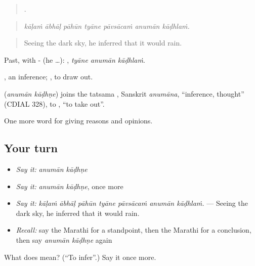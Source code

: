 \begin{quote}
      .
\end{quote}

\begin{quote}
\emph{kāḷaṁ ābhāḷ pāhūn tyāne pāvsācaṁ anumān kāḍhlaṁ.}
\end{quote}

\begin{quote}
Seeing the dark sky, he inferred that it would rain.
\end{quote}

Past, with - (he …):   , \emph{tyāne anumān kāḍhlaṁ}.

, an inference; , to draw out.

\begin{cousinweb}
\textbf{ } (\emph{anumān kāḍhṇe}) joins the tatsama , Sanskrit \emph{anumāna}, \textquotedblleft{}inference, thought\textquotedblright{} (CDIAL 328), to , \textquotedblleft{}to take out\textquotedblright{}.
\end{cousinweb}

\begin{grammarlens}[title={What you've built}]
One more word for giving reasons and opinions.
\end{grammarlens}

\subsection*{Your turn}
\begin{itemize}
\raggedright
  \item \emph{Say it:} \emph{anumān kāḍhṇe}
  \item \emph{Say it:} \emph{anumān kāḍhṇe}, once more
  \item \emph{Say it:} \emph{kāḷaṁ ābhāḷ pāhūn tyāne pāvsācaṁ anumān kāḍhlaṁ.} — Seeing the dark sky, he inferred that it would rain.
  \item \emph{Recall:} say the Marathi for a standpoint, then the Marathi for a conclusion, then say \emph{anumān kāḍhṇe} again
\end{itemize}

\begin{tcolorbox}[breakable,colback=teal!4,colframe=teal!35!black,title={Before you move on}]
What does   mean? (\textquotedblleft{}To infer\textquotedblright{}.) Say it once more.
\end{tcolorbox}
